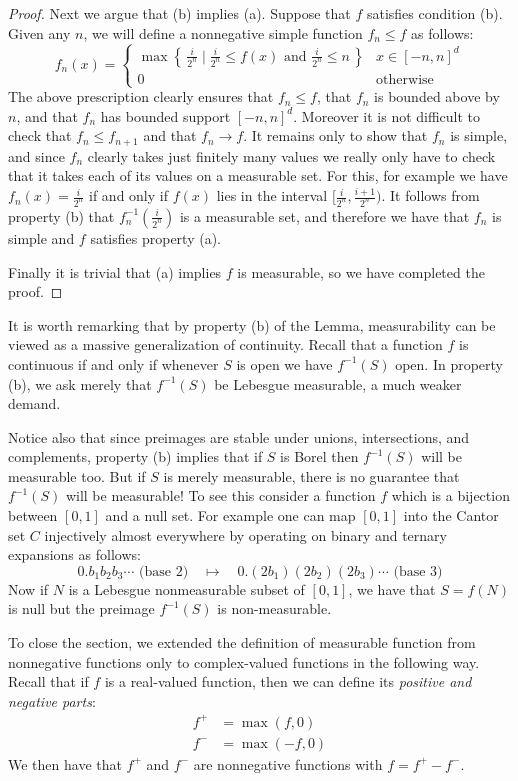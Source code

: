 \documentclass[10pt,oneside]{amsbook}
\newcommand{\set}[1]{\left\{\,#1\,\right\}}
\theoremstyle{definition}
\theoremstyle{plain}
\theoremstyle{definition}
\theoremstyle{remark}
\numberwithin{equation}{section}
\numberwithin{figure}{section}
\begin{document}
\begin{proof}
  Next we argue that (b) implies (a). Suppose that $f$ satisfies condition (b). Given any $n$, we will define a nonnegative simple function $f_n\leq f$ as follows:
  \[f_n(x)=
    \begin{cases}
      \max\set{\frac{i}{2^n}\mid \frac{i}{2^n}\leq f(x)\text{ and } \frac{i}{2^n}\leq n}&x\in[-n,n]^d\\
      0&\text{otherwise}
    \end{cases}
  \]
  The above prescription clearly ensures that $f_n\leq f$, that $f_n$ is bounded above by $n$, and that $f_n$ has bounded support $[-n,n]^d$. Moreover it is not difficult to check that $f_n\leq f_{n+1}$ and that $f_n\to f$. It remains only to show that $f_n$ is simple, and since $f_n$ clearly takes just finitely many values we really only have to check that it takes each of its values on a measurable set. For this, for example we have $f_n(x)=\frac{i}{2^n}$ if and only if $f(x)$ lies in the interval $[\frac{i}{2^n},\frac{i+1}{2^n})$. It follows from property (b) that $f_n^{-1}(\frac{i}{2^n})$ is a measurable set, and therefore we have that $f_n$ is simple and $f$ satisfies property (a).

  Finally it is trivial that (a) implies $f$ is measurable, so we have completed the proof.
\end{proof}

It is worth remarking that by property (b) of the Lemma, measurability can be viewed as a massive generalization of continuity. Recall that a function $f$ is continuous if and only if whenever $S$ is open we have $f^{-1}(S)$ open. In property (b), we ask merely that $f^{-1}(S)$ be Lebesgue measurable, a much weaker demand.

Notice also that since preimages are stable under unions, intersections, and complements, property (b) implies that if $S$ is Borel then $f^{-1}(S)$ will be measurable too. But if $S$ is merely measurable, there is no guarantee that $f^{-1}(S)$ will be measurable! To see this consider a function $f$ which is a bijection between $[0,1]$ and a null set. For example one can map $[0,1]$ into the Cantor set $C$ injectively almost everywhere by operating on binary and ternary expansions as follows:
\[0.b_1b_2b_3\cdots\text{ (base 2)}\quad\mapsto\quad 0.(2b_1)(2b_2)(2b_3)\cdots\text{ (base 3)}
\]
Now if $N$ is a Lebesgue nonmeasurable subset of $[0,1]$, we have that $S=f(N)$ is null but the preimage $f^{-1}(S)$ is non-measurable.

To close the section, we extended the definition of measurable function from nonnegative functions only to complex-valued functions in the following way. Recall that if $f$ is a real-valued function, then we can define its \emph{positive and negative parts}:
\begin{align*}
  f^+&=\max(f,0)\\
  f^-&=\max(-f,0)
\end{align*}
We then have that $f^+$ and $f^-$ are nonnegative functions with $f=f^+-f^-$.
\end{document}
